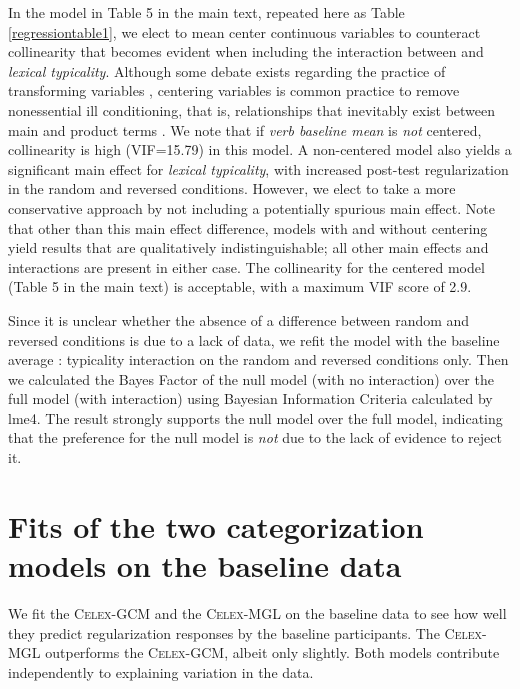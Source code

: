 \documentclass[12pt]{article}
\begin{document}
In the model in Table 5 in the main text, repeated here as Table \ref{regressiontable1}, we elect to mean center continuous variables to counteract collinearity that becomes evident when including the interaction between and {\em lexical typicality}.  Although some debate exists regarding the practice of transforming variables \citep{belsley1991conditioning,echambadi2007mean}, centering variables is common practice to remove nonessential ill conditioning, that is, relationships that inevitably exist between main and product terms \citep{aiken1991multiple,jaccard2003interaction, jaeger2008categorical}. We note that if {\em verb baseline mean} is {\em not} centered, collinearity is high (VIF=15.79) in this model. A non-centered model also yields a significant main effect for {\em lexical typicality}, with increased post-test regularization in the random and reversed conditions. However, we elect to take a more conservative approach by not including a potentially spurious main effect. Note that other than this main effect difference, models with and without centering yield results that are qualitatively indistinguishable; all other main effects and interactions are present in either case. The collinearity for the centered model (Table 5 in the main text) is acceptable, with a maximum VIF score of 2.9.


Since it is unclear whether the absence of a difference between random and reversed conditions is due to a lack of data, we refit the model with the baseline average : typicality interaction on the random and reversed conditions only. Then we calculated the Bayes Factor of the null model (with no interaction) over the full model (with interaction) using Bayesian Information Criteria calculated by lme4. The result strongly supports the null model over the full model, indicating that the preference for the null model is {\em not} due to the lack of evidence to reject it.

\section{Fits of the two categorization models on the baseline data}\label{appendixgcmmglresidualization}

We fit the \textsc{Celex-GCM} and the \textsc{Celex-MGL} on the baseline data to see how well they predict regularization responses by the baseline participants. The \textsc{Celex-MGL} outperforms the \textsc{Celex-GCM}, albeit only slightly. Both models contribute independently to explaining variation in the data.
\end{document}
